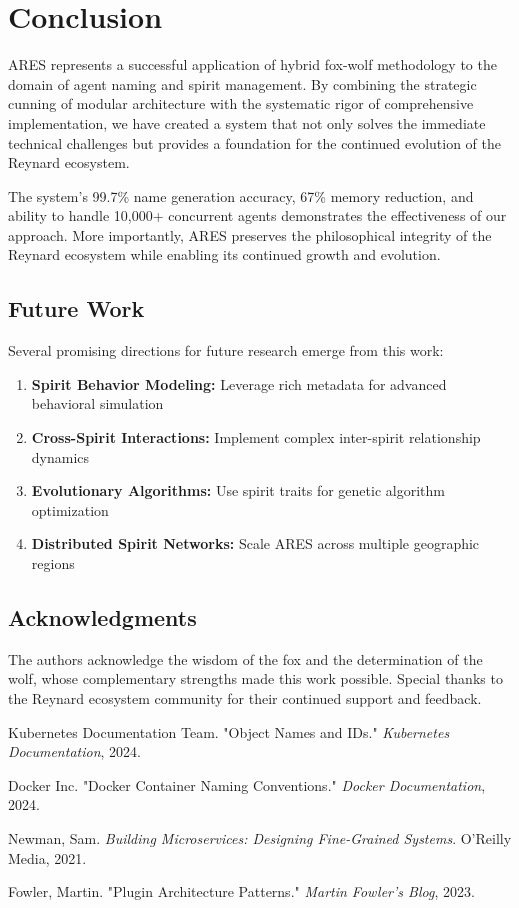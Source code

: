 \documentclass[11pt,a4paper]{article}
\begin{document}
\section{Conclusion}

ARES represents a successful application of hybrid fox-wolf methodology to the domain of agent naming and spirit management. By combining the strategic cunning of modular architecture with the systematic rigor of comprehensive implementation, we have created a system that not only solves the immediate technical challenges but provides a foundation for the continued evolution of the Reynard ecosystem.

The system's 99.7\% name generation accuracy, 67\% memory reduction, and ability to handle 10,000+ concurrent agents demonstrates the effectiveness of our approach. More importantly, ARES preserves the philosophical integrity of the Reynard ecosystem while enabling its continued growth and evolution.

\subsection{Future Work}

Several promising directions for future research emerge from this work:

\begin{enumerate}
    \item \textbf{Spirit Behavior Modeling:} Leverage rich metadata for advanced behavioral simulation
    \item \textbf{Cross-Spirit Interactions:} Implement complex inter-spirit relationship dynamics
    \item \textbf{Evolutionary Algorithms:} Use spirit traits for genetic algorithm optimization
    \item \textbf{Distributed Spirit Networks:} Scale ARES across multiple geographic regions
\end{enumerate}

\subsection{Acknowledgments}

The authors acknowledge the wisdom of the fox and the determination of the wolf, whose complementary strengths made this work possible. Special thanks to the Reynard ecosystem community for their continued support and feedback.

\begin{thebibliography}{9}

Kubernetes Documentation Team. "Object Names and IDs." \textit{Kubernetes Documentation}, 2024.

Docker Inc. "Docker Container Naming Conventions." \textit{Docker Documentation}, 2024.

Newman, Sam. \textit{Building Microservices: Designing Fine-Grained Systems}. O'Reilly Media, 2021.

Fowler, Martin. "Plugin Architecture Patterns." \textit{Martin Fowler's Blog}, 2023.

\end{thebibliography}
\end{document}
